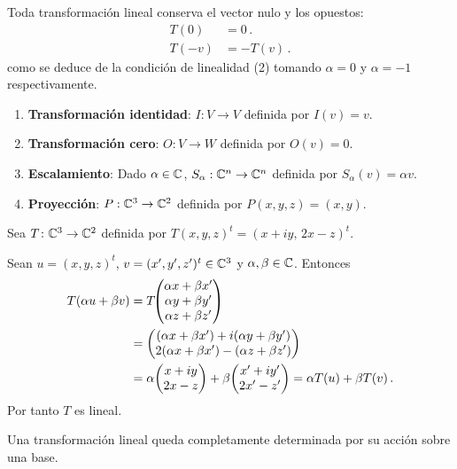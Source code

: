 Toda transformación lineal conserva el vector nulo y los opuestos:
\begin{align*}
  T(0)  & =0\,.     \\
  T(-v) & =-T(v)\,.
\end{align*}
como se deduce de la condición de linealidad (2) tomando $\alpha=0$ y $\alpha=-1$ respectivamente.

\begin{eje}
  \begin{enumerate}
    \item \textbf{Transformación identidad}: $I: V \to V$ definida por $I(v) = v$.

    \item \textbf{Transformación cero}: $O: V \to W$ definida por $O(v) = 0$.

    \item \textbf{Escalamiento}: Dado $\alpha \in \mathbb{C}$, $S_\alpha: \mathbb{C}^n \to \mathbb{C}^n$ definida por $S_\alpha(v) = \alpha v$.

    \item \textbf{Proyección}: $P: \mathbb{C}^3 \to \mathbb{C}^2$ definida por $P(x, y, z) = (x, y)$.
  \end{enumerate}
\end{eje}

\begin{eje}
  \label{eje:TL-verificacion}
  Sea $T\colon\mathbb{C}^3\to\mathbb{C}^2$ definida por $T(x,y,z)^t = (x+iy,\,2x-z)^t$.

  Sean $u=(x,y,z)^t$, $v=(x',y',z')^t\in\mathbb{C}^3$ y $\alpha,\beta\in\mathbb{C}$. Entonces
  \begin{align*}
    T(\alpha u+\beta v)
     & = T\!\mqty(\alpha x+\beta x'                     \\\alpha y+\beta y'\\\alpha z+\beta z')\\
     & = \mqty((\alpha x+\beta x')+i(\alpha y+\beta y') \\2(\alpha x+\beta x')-(\alpha z+\beta z'))\\
     & = \alpha\mqty(x+iy                               \\2x-z) + \beta\mqty(x'+iy'\\2x'-z')
    = \alpha T(u)+\beta T(v)\,.
  \end{align*}
  Por tanto $T$ es lineal.
\end{eje}

Una transformación lineal queda completamente determinada por su acción sobre una base.

